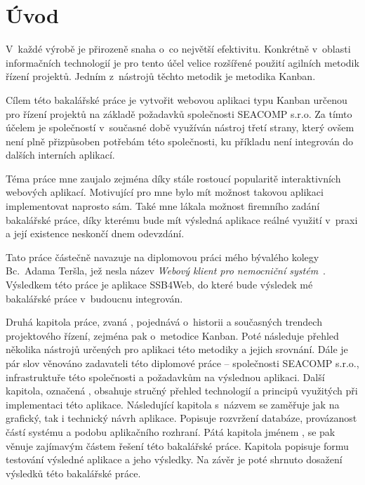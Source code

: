 \chapter{Úvod}
V~každé výrobě je přirozeně snaha o~co největší efektivitu. Konkrétně v~oblasti informačních technologií je pro tento účel velice rozšířené použití agilních metodik řízení projektů. Jedním z~nástrojů těchto metodik je metodika Kanban.

Cílem této bakalářské práce je vytvořit webovou aplikaci typu Kanban určenou pro řízení projektů na základě požadavků společnosti SEACOMP s.r.o. Za tímto účelem je společností v~současné době využíván nástroj třetí strany, který ovšem není plně přizpůsoben potřebám této společnosti, ku příkladu není integrován do dalších interních aplikací.

Téma práce mne zaujalo zejména díky stále rostoucí popularitě interaktivních webových aplikací. Motivující pro mne bylo mít možnost takovou aplikaci implementovat naprosto sám. Také mne lákala možnost firemního zadání bakalářské práce, díky kterému bude mít výsledná aplikace reálné využití v~praxi a její existence neskončí dnem odevzdání. 

Tato práce částečně navazuje na diplomovou práci mého bývalého kolegy Bc.~Adama Teršla, jež nesla název \emph{Webový klient pro nemocniční systém}~\cite{bib:tersl}. Výsledkem této práce je aplikace SSB4Web, do které bude výsledek mé bakalářské práce v~budoucnu integrován.

Druhá kapitola práce, zvaná , pojednává o~historii a současných trendech projektového řízení, zejména pak o~metodice Kanban. Poté následuje přehled několika nástrojů určených pro aplikaci této metodiky a jejich srovnání.
Dále je pár slov věnováno zadavateli této diplomové práce -- společnosti SEACOMP s.r.o., infrastruktuře této společnosti a požadavkům na výslednou aplikaci.
Další kapitola, označená , obsahuje stručný přehled technologií a principů využitých při implementaci této aplikace.
Následující kapitola s~názvem  se zaměřuje jak na grafický, tak i technický návrh aplikace. Popisuje rozvržení databáze, provázanost částí systému a podobu aplikačního rozhraní.
Pátá kapitola jménem , se pak věnuje zajímavým částem řešení této bakalářské práce. 
Kapitola  popisuje formu testování výsledné aplikace a jeho výsledky.
Na závěr je poté shrnuto dosažení výsledků této bakalářské práce.



